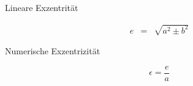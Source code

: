 \documentclass[a4paper]{article}
\begin{document}
\large{Lineare Exzentrität}

\begin{displaymath}
	\begin{array}{rcl}
		e & = & \sqrt{a^2\pm b^2}
	\end{array}
\end{displaymath}

\large{Numerische Exzentrizität}

\begin{displaymath}
	\epsilon = \frac{e}{a}
\end{displaymath}
\end{document}
